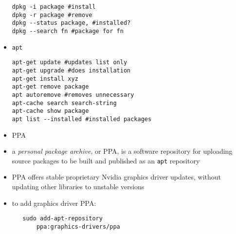 \documentclass[twocolumn]{IEEEtran} %
\begin{document}
\begin{itemize}
\begin{verbatim}
dpkg -i package #install
dpkg -r package #remove
dpkg --status package, #installed?
dpkg --search fn #package for fn
    \end{verbatim}
    \item \verb|apt|
    \begin{verbatim}
apt-get update #updates list only
apt-get upgrade #does installation
apt-get install xyz
apt-get remove package
apt autoremove #removes unnecessary
apt-cache search search-string
apt-cache show package
apt list --installed #installed packages
    \end{verbatim}
    \item PPA
    \bi
        \item a \emph{personal package archive}, or PPA, is a software repository for uploading source packages to be built and published as an \verb|apt| repository
        \item PPA offers stable proprietary Nvidia graphics driver updates, without updating other libraries to unstable versions
        \item to add graphics driver PPA:
    \begin{verbatim}
   sudo add-apt-repository
       ppa:graphics-drivers/ppa
    \end{verbatim}
    \ei
\end{itemize}


\newpage
\end{document}
